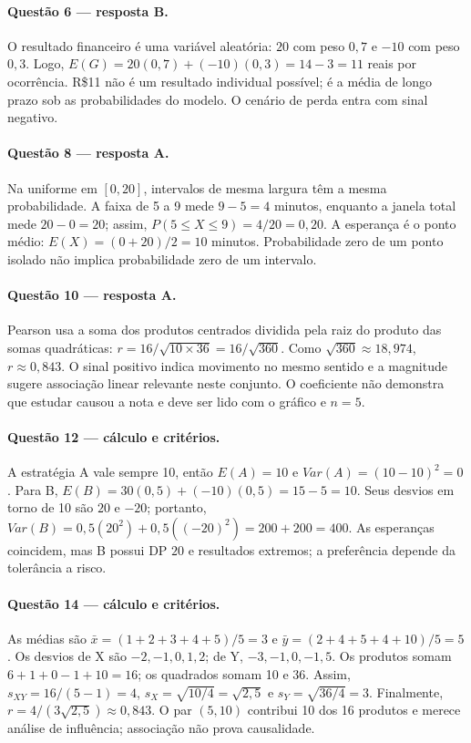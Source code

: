 \paragraph{Questão 6 — resposta B.} O resultado financeiro é uma variável aleatória: $20$ com peso $0{,}7$ e $-10$ com peso $0{,}3$. Logo, $E(G)=20(0{,}7)+(-10)(0{,}3)=14-3=11$ reais por ocorrência. R\$11 não é um resultado individual possível; é a média de longo prazo sob as probabilidades do modelo. O cenário de perda entra com sinal negativo.

\paragraph{Questão 8 — resposta A.} Na uniforme em $[0,20]$, intervalos de mesma largura têm a mesma probabilidade. A faixa de 5 a 9 mede $9-5=4$ minutos, enquanto a janela total mede $20-0=20$; assim, $P(5\le X\le9)=4/20=0{,}20$. A esperança é o ponto médio: $E(X)=(0+20)/2=10$ minutos. Probabilidade zero de um ponto isolado não implica probabilidade zero de um intervalo.

\paragraph{Questão 10 — resposta A.} Pearson usa a soma dos produtos centrados dividida pela raiz do produto das somas quadráticas: $r=16/\sqrt{10\times36}=16/\sqrt{360}$. Como $\sqrt{360}\approx18{,}974$, $r\approx0{,}843$. O sinal positivo indica movimento no mesmo sentido e a magnitude sugere associação linear relevante neste conjunto. O coeficiente não demonstra que estudar causou a nota e deve ser lido com o gráfico e $n=5$.

\paragraph{Questão 12 — cálculo e critérios.} A estratégia A vale sempre 10, então $E(A)=10$ e $Var(A)=(10-10)^2=0$. Para B, $E(B)=30(0{,}5)+(-10)(0{,}5)=15-5=10$. Seus desvios em torno de 10 são $20$ e $-20$; portanto, $Var(B)=0{,}5(20^2)+0{,}5((-20)^2)=200+200=400$. As esperanças coincidem, mas B possui DP $20$ e resultados extremos; a preferência depende da tolerância a risco.

\paragraph{Questão 14 — cálculo e critérios.} As médias são $\bar x=(1+2+3+4+5)/5=3$ e $\bar y=(2+4+5+4+10)/5=5$. Os desvios de X são $-2,-1,0,1,2$; de Y, $-3,-1,0,-1,5$. Os produtos somam $6+1+0-1+10=16$; os quadrados somam 10 e 36. Assim, $s_{XY}=16/(5-1)=4$, $s_X=\sqrt{10/4}=\sqrt{2{,}5}$ e $s_Y=\sqrt{36/4}=3$. Finalmente, $r=4/(3\sqrt{2{,}5})\approx0{,}843$. O par $(5,10)$ contribui 10 dos 16 produtos e merece análise de influência; associação não prova causalidade.
